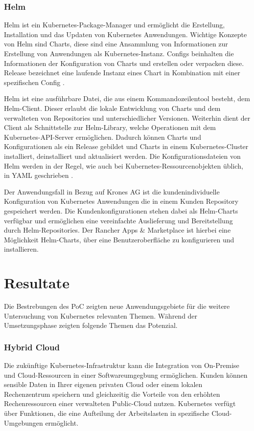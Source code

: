 \subsubsection{Helm}
Helm ist ein Kubernetes-Package-Manager und ermöglicht die Erstellung, Installation und das Updaten von Kubernetes Anwendungen.
Wichtige Konzepte von Helm sind Charts, diese sind eine Ansammlung von Informationen zur Erstellung von Anwendungen als Kubernetes-Instanz. 
Configs beinhalten die Informationen der Konfiguration von Charts und erstellen oder verpacken diese.
Release bezeichnet eine laufende Instanz eines Chart in Kombination mit einer spezifischen Config \cite{helm}.

Helm ist eine ausführbare Datei, die aus einem Kommandozeilentool besteht, dem Helm-Client.
Dieser erlaubt die lokale Entwicklung von Charts und dem verwalteten von Repositories und unterschiedlicher Versionen.
Weiterhin dient der Client als Schnittstelle zur Helm-Library, welche Operationen mit dem Kubernetes-API-Server ermöglichen.
Dadurch können Charts und Konfigurationen als ein Release gebildet
und Charts in einem Kubernetes-Cluster installiert, deinstalliert und aktualisiert werden.
Die Konfigurationsdateien von Helm werden in der Regel, wie auch bei Kubernetes-Ressourcenobjekten üblich, in YAML geschrieben \cite{helm}.

Der Anwendungsfall in Bezug auf Krones AG ist die kundenindividuelle Konfiguration von Kubernetes Anwendungen die in einem Kunden Repository gespeichert werden.
Die Kundenkonfigurationen stehen dabei als Helm-Charts verfügbar und ermöglichen eine vereinfachte Auslieferung und Bereitstellung durch Helm-Repositories.
Der Rancher Apps \& Marketplace ist hierbei eine Möglichkeit Helm-Charts, über eine Benutzeroberfläche zu konfigurieren und installieren.

\newpage

\section{Resultate}
Die Bestrebungen des PoC zeigten neue Anwendungsgebiete für die weitere Untersuchung von Kubernetes relevanten Themen.
Während der Umsetzungsphase zeigten folgende Themen das Potenzial.

\subsubsection{Hybrid Cloud}
Die zukünftige Kubernetes-Infrastruktur kann die Integration von On-Premise und Cloud-Ressourcen in einer Softwareumgegbung ermöglichen.
Kunden können sensible Daten in Ihrer eigenen privaten Cloud oder einem lokalen Rechenzentrum speichern und gleichzeitig die
Vorteile von den erhöhten Rechenressourcen einer verwalteten Public-Cloud nutzen.
Kubernetes verfügt über Funktionen, die eine Aufteilung der Arbeitslasten in spezifische Cloud-Umgebungen ermöglicht.

